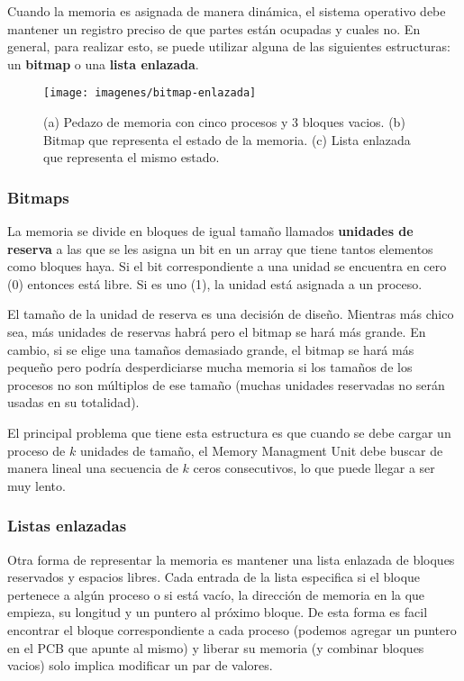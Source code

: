 Cuando la memoria es asignada de manera dinámica, el sistema operativo debe mantener un registro preciso de que partes están ocupadas y cuales no. En general, para realizar esto, se puede utilizar alguna de las siguientes estructuras: un \textbf{bitmap} o una \textbf{lista enlazada}.

\begin{figure}[h]
	\centering
	\texttt{[image: imagenes/bitmap-enlazada]}
	\caption[Pedazo de memoria con cinco procesos y 3 bloques vacios.]{(a) Pedazo de memoria con cinco procesos y 3 bloques vacios. (b) Bitmap que representa el estado de la memoria. (c) Lista enlazada que representa el mismo estado.}
	\label{fig:bitmap-enlazada}
\end{figure}


\subsubsection{Bitmaps} 
La memoria se divide en bloques de igual tamaño llamados \textbf{unidades de reserva } a las que se les asigna un bit en un array que tiene tantos elementos como bloques haya. Si el bit correspondiente a una unidad se encuentra en cero (0) entonces está libre. Si es uno (1), la unidad está asignada a un proceso.

El tamaño de la unidad de reserva es una decisión de diseño. Mientras más chico sea, más unidades de reservas habrá pero el bitmap se hará más grande. En cambio, si se elige una tamaños demasiado grande, el bitmap se hará más pequeño pero podría desperdiciarse mucha memoria si los tamaños de los procesos no son múltiplos de ese tamaño (muchas unidades reservadas no serán usadas en su totalidad).

El principal problema que tiene esta estructura es que cuando se debe cargar un proceso de $k$ unidades de tamaño, el Memory Managment Unit debe buscar de manera lineal una secuencia de $k$ ceros consecutivos, lo que puede llegar a ser muy lento.

\subsubsection{Listas enlazadas} Otra forma de representar la memoria es mantener una lista enlazada de bloques reservados y espacios libres. Cada entrada de la lista especifica si el bloque pertenece a algún proceso o si está vacío, la dirección de memoria en la que empieza, su longitud y un puntero al próximo bloque. De esta forma es facil encontrar el bloque correspondiente a cada proceso (podemos agregar un puntero en el PCB que apunte al mismo) y liberar su memoria (y combinar bloques vacios) solo implica modificar un par de valores.

